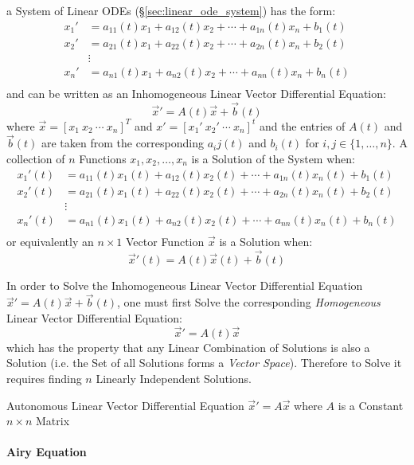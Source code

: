 {a System of Linear ODEs (\S\ref{sec:linear_ode_system}) has the form:
\begin{align*}
  x_1' & = a_{11}(t)x_1 + a_{12}(t)x_2 + \cdots + a_{1n}(t)x_n + b_1(t) \\
  x_2' & = a_{21}(t)x_1 + a_{22}(t)x_2 + \cdots + a_{2n}(t)x_n + b_2(t) \\
    & \vdots \\
  x_n' & = a_{n1}(t)x_1 + a_{n2}(t)x_2 + \cdots + a_{nn}(t)x_n + b_n(t) \\
\end{align*}
and can be written as an Inhomogeneous Linear Vector Differential Equation:
\[
  \vec{x}' = A(t)\vec{x} + \vec{b}(t)
\]
where $\vec{x} = [x_1\ x_2\ \cdots\ x_n]^T$ and $x' =
[x_1'\ x_2'\ \cdots\ x_n]^t$ and the entries of $A(t)$ and $\vec{b}(t)$ are
taken from the corresponding $a_ij(t)$ and $b_i(t)$ for $i,j \in
\{1,\ldots,n\}$.
A collection of $n$ Functions $x_1, x_2, \ldots, x_n$ is a Solution of the
System when:
\begin{align*}
  x_1'(t) & = a_{11}(t)x_1(t) + a_{12}(t)x_2(t) + \cdots +
    a_{1n}(t)x_n(t) + b_1(t) \\
  x_2'(t) & = a_{21}(t)x_1(t) + a_{22}(t)x_2(t) + \cdots +
    a_{2n}(t)x_n(t) + b_2(t) \\
    & \vdots \\
  x_n'(t) & = a_{n1}(t)x_1(t) + a_{n2}(t)x_2(t) + \cdots +
    a_{nn}(t)x_n(t) + b_n(t) \\
\end{align*}
or equivalently an $n\times{1}$ Vector Function $\vec{x}$ is a Solution when:
\[
  \vec{x}'(t) = A(t)\vec{x}(t) + \vec{b}(t)
\]

In order to Solve the Inhomogeneous Linear Vector Differential Equation
$\vec{x}' = A(t)\vec{x} + \vec{b}(t)$, one must first Solve the corresponding
\emph{Homogeneous} Linear Vector Differential Equation:
\[
  \vec{x}' = A(t)\vec{x}
\]
which has the property that any Linear Combination of Solutions is also a
Solution (i.e. the Set of all Solutions forms a \emph{Vector Space}). Therefore
to Solve it requires finding $n$ Linearly Independent Solutions.

Autonomous Linear Vector Differential Equation $\vec{x}' = A\vec{x}$ where $A$
is a Constant $n\times{n}$ Matrix



\paragraph{Airy Equation}\label{sec:airy_equation}\hfill

}

